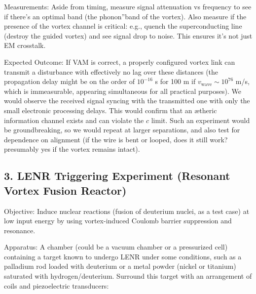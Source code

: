 Measurements: Aside from timing, measure signal attenuation vs frequency to see if there's an optimal band (the \grqq phonon\textquotedblright band of the vortex). Also measure if the presence of the vortex channel is critical: e.g., quench the superconducting line (destroy the guided vortex) and see signal drop to noise. This ensures it's not just EM crosstalk.


Expected Outcome: If VAM is correct, a properly configured vortex link can transmit a disturbance with effectively no lag over these distances (the propagation delay might be on the order of $10^{-16}$ s for 100 m if $v_\text{wave}\sim10^{76}$ m/s, which is immeasurable, appearing simultaneous for all practical purposes). We would observe the received signal syncing with the transmitted one with only the small electronic processing delays. This would confirm that an ætheric information channel exists and can violate the $c$ limit. Such an experiment would be groundbreaking, so we would repeat at larger separations, and also test for dependence on alignment (if the wire is bent or looped, does it still work? presumably yes if the vortex remains intact).


\subsection*{3. LENR Triggering Experiment (Resonant Vortex Fusion Reactor)}

Objective: Induce nuclear reactions (fusion of deuterium nuclei, as a test case) at low input energy by using vortex-induced Coulomb barrier suppression and resonance.


Apparatus: A chamber (could be a vacuum chamber or a pressurized cell) containing a target known to undergo LENR under some conditions, such as a palladium rod loaded with deuterium or a metal powder (nickel or titanium) saturated with hydrogen/deuterium. Surround this target with an arrangement of coils and piezoelectric transducers:


